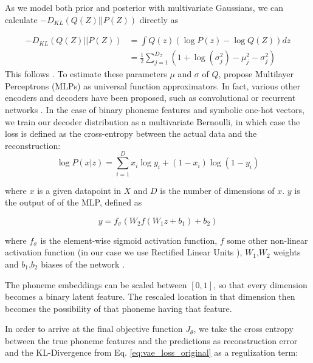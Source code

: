 \documentclass[6pt]{article}
\begin{document}
As we model both prior and posterior with multivariate Gaussians, we can calculate $-D_{KL}(Q(Z)||P(Z))$ directly as

\begin{equation}
\begin{split}
-D_{KL}(Q(Z)||P(Z)) & = \int Q(z) (\log P(z) - \log Q(Z)) dz\\
& = \frac{1}{2}\sum_{j=1}^{D_{\mathcal{Z}}}(1+\log(\sigma_j^2)-\mu_j^2-\sigma_j^2)
\end{split}
\end{equation}
This follows \cite[p. 10-11]{kingma2013auto}.
To estimate these parameters $\mu$ and $\sigma$ of $Q$,  \cite{kingma2013auto} propose Multilayer Perceptrons (MLPs) as universal function approximators. In fact, various other encoders and decoders have been proposed, such as convolutional or recurrent networks \citep{kulkarni2015deep,bowman2015generating,fabius2014variational}. 
In the case of binary phoneme features and symbolic one-hot vectors, we train our decoder distribution as a multivariate Bernoulli, in which case the loss is defined as the cross-entropy between the actual data and the reconstruction:
\begin{equation}
\log P(x|z) = \sum_{i=1}^{D} x_i \log y_i + (1-x_i) \log (1-y_i)
\label{eq:multivariate_bernoulli_prob}
\end{equation}

where $x$ is a given datapoint in $X$ and $D$ is the number of dimensions of $x$. $y$ is the output of of the MLP, defined as 

\begin{equation}
y = f_\sigma (W_2 f(W_1 z + b_1 ) + b_2)
\end{equation}

where $f_\sigma$ is the element-wise sigmoid activation function, $f$ some other non-linear activation function (in our case we use Rectified Linear Units \citep{nair2010rectified}), $W_1$,$W_2$ weights and $b_1$,$b_2$ biases of the network \citep[p. 11]{kingma2013auto}.

The phoneme embeddings  can be scaled between $[0,1]$, so that every dimension becomes a binary latent feature. The rescaled location in that dimension then becomes the possibility of that phoneme having that feature. 

In order to arrive at the final objective function $J_\theta$, we take the cross entropy between the true phoneme features and the predictions as reconstruction error and the KL-Divergence from Eq. \ref{eq:vae_loss_original} as a regulization term:
\end{document}
